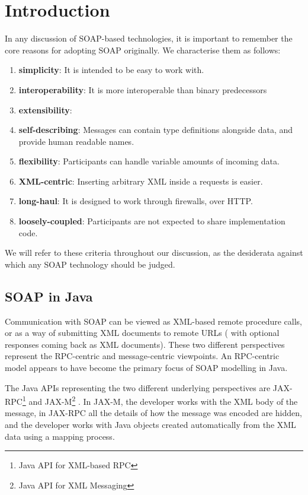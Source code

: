 \section{Introduction}
\label{introduction}

In any discussion of SOAP-based technologies, it is important to
remember the core reasons for adopting SOAP originally. We
characterise them as follows:

\begin{enumerate}
\item \textbf{simplicity}: It is intended to be easy to work with.
\item \textbf{interoperability}: It is more interoperable than binary predecessors
\item \textbf{extensibility}: 
\item \textbf{self-describing}: Messages can contain type definitions alongside
data, and provide human readable names.
\item \textbf{flexibility}: Participants can handle variable amounts of
incoming data.
\item \textbf{XML-centric}: Inserting arbitrary XML inside a requests
is easier.
\item \textbf{long-haul}: It is designed to work through firewalls, over HTTP.
\item \textbf{loosely-coupled}: Participants are not expected to share
implementation code.
\end{enumerate}

We will refer to these criteria throughout our discussion, as the
desiderata against which any SOAP technology should be judged.

\subsection{SOAP in Java}
\label{intro:java}

Communication with SOAP can be viewed as XML-based remote procedure
calls, or as a way of submitting XML documents to remote URLs ( with
optional responses coming back as XML documents). These two different
perspectives represent the RPC-centric and message-centric
viewpoints. An RPC-centric model appears to have become the primary
focus of SOAP modelling in Java.

The Java APIs representing the two different underlying perspectives
are JAX-RPC\footnote{Java API for XML-based RPC}
\cite{spec:JAX-RPC-11} and JAX-M\footnote{Java API for XML Messaging}
\cite{spec:JAX-M-11}. In JAX-M, the developer works with the XML body
of the message, in JAX-RPC all the details of how the message was
encoded are hidden, and the developer works with Java objects created
automatically from the XML data using a mapping process.

